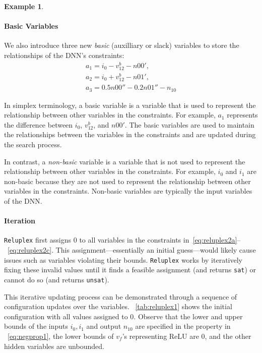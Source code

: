 \documentclass[oneside,11pt,dvipsnames]{book}
\numberwithin{equation}{section}
\theoremstyle{definition}
\newtheorem{example}{Example}[section]
\theoremstyle{remark}
\newcommand{\tvn}[1]{\iftoggle{usecomment}{{\color{red}{[TVN]: #1}}}{}}
\newcommand{\reluplex}{\texttt{Reluplex}}
\begin{document}
\begin{example}
\paragraph{Basic Variables} We also introduce three new \emph{basic} (auxilliary or slack) variables to store the relationships of the DNN's constraints:
\begin{gather}
  a_1 = i_0 - v^b_{12} - n00'\label{eq:reluplex2a},\\
  a_2 = i_0 + v^b_{12} - n01'\label{eq:reluplex2b},\\
  a_3 = 0.5n00'' -0.2 n01'' - n_{10}\label{eq:reluplex2c}
\end{gather}

In simplex terminology, a basic variable is a variable that is used to represent the relationship between other variables in the constraints. For example, $a_1$ represents the difference between $i_0$, $v^b_{12}$, and $n00'$. The basic variables are used to maintain the relationships between the variables in the constraints and are updated during the search process.

In contrast, a \emph{non-basic} variable is a variable that is not used to represent the relationship between other variables in the constraints. For example, $i_0$ and $i_1$ are non-basic because they are not used to represent the relationship between other variables in the constraints. Non-basic variables are typically the input variables of the DNN.

\paragraph{Iteration} \reluplex{} first assigns 0 to all \tvn{basic?} variables in the constraints in~\autoref{eq:reluplex2a}--~\autoref{eq:reluplex2c}.  This assignment---essentially an initial guess---would likely cause issues such as variables violating their bounds.  \reluplex{} works by iteratively fixing these invalid values until it finds a feasible assignment (and returns \texttt{sat}) or cannot do so (and returns \texttt{unsat}).

This iterative updating process can be demonstrated through a sequence of configuration updates over the variables.
~\autoref{tab:reluplex1} shows the initial configuration with all values assigned to 0.
Observe that the lower and upper bounds of the inputs $i_0, i_1$ and output $n_{10}$ are specified in the property in ~\autoref{eq:negprop1}, the lower bounds of $v_f$'s representing ReLU are 0, and the other hidden variables are unbounded.


\end{example}
\end{document}
